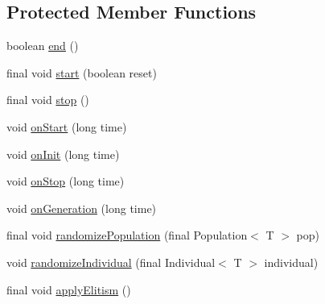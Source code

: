 \subsection*{Protected Member Functions}
\begin{CompactItemize}
\item 
boolean \hyperlink{classjenes_1_1_genetic_algorithm_3_01_t_01extends_01_chromosome_01_4_41376d72c82d4503693eebb3832cf772}{end} ()
\item 
final void \hyperlink{classjenes_1_1_genetic_algorithm_3_01_t_01extends_01_chromosome_01_4_6fd4badfc67b0c2b0d43c6dd4a14875e}{start} (boolean reset)
\item 
final void \hyperlink{classjenes_1_1_genetic_algorithm_3_01_t_01extends_01_chromosome_01_4_6d0de9962bff7d63a4c197eeef6da7d0}{stop} ()
\item 
void \hyperlink{classjenes_1_1_genetic_algorithm_3_01_t_01extends_01_chromosome_01_4_0ed4a97cf7e3266913eaad8092913de3}{onStart} (long time)
\item 
void \hyperlink{classjenes_1_1_genetic_algorithm_3_01_t_01extends_01_chromosome_01_4_85479397ce0f8bd995b97fa91f4d6690}{onInit} (long time)
\item 
void \hyperlink{classjenes_1_1_genetic_algorithm_3_01_t_01extends_01_chromosome_01_4_04258af6f64ec98561b015651d20f9ea}{onStop} (long time)
\item 
void \hyperlink{classjenes_1_1_genetic_algorithm_3_01_t_01extends_01_chromosome_01_4_ed0d630f1e0b290bb87ba9ab8b164b89}{onGeneration} (long time)
\item 
final void \hyperlink{classjenes_1_1_genetic_algorithm_3_01_t_01extends_01_chromosome_01_4_7824bcf504331528000af8be62073d53}{randomizePopulation} (final Population$<$ T $>$ pop)
\item 
void \hyperlink{classjenes_1_1_genetic_algorithm_3_01_t_01extends_01_chromosome_01_4_7cefcc35bf6c98eb9b7c33c074b32d69}{randomizeIndividual} (final Individual$<$ T $>$ individual)
\item 
final void \hyperlink{classjenes_1_1_genetic_algorithm_3_01_t_01extends_01_chromosome_01_4_85647664d61cca550ed40dd70b074365}{applyElitism} ()
\end{CompactItemize}
